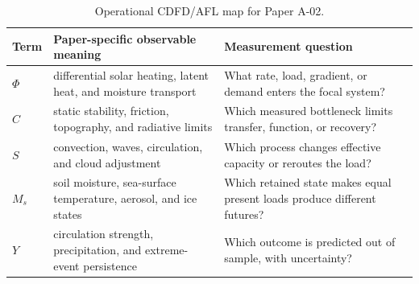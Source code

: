 \documentclass[12pt,a4paper]{article}
\begin{document}
\begin{table}[htbp]
\centering
\small
\caption{Operational CDFD/AFL map for Paper A-02.}
\begin{tabularx}{\textwidth}{|l|X|X|}
\hline
\textbf{Term} & \textbf{Paper-specific observable meaning} & \textbf{Measurement question} \\
\hline
$\Phi$ & differential solar heating, latent heat, and moisture transport & What rate, load, gradient, or demand enters the focal system? \\
\hline
$C$ & static stability, friction, topography, and radiative limits & Which measured bottleneck limits transfer, function, or recovery? \\
\hline
$S$ & convection, waves, circulation, and cloud adjustment & Which process changes effective capacity or reroutes the load? \\
\hline
$M_s$ & soil moisture, sea-surface temperature, aerosol, and ice states & Which retained state makes equal present loads produce different futures? \\
\hline
$Y$ & circulation strength, precipitation, and extreme-event persistence & Which outcome is predicted out of sample, with uncertainty? \\
\hline
\end{tabularx}
\end{table}
\end{document}

